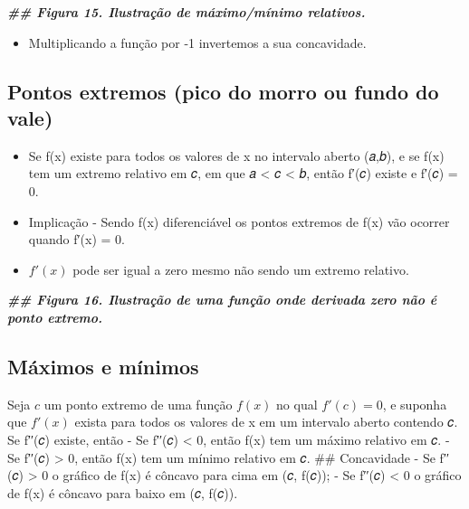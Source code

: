 \documentclass[
]{article}
\newenvironment{Shaded}{\begin{snugshade}}{\end{snugshade}}
\newcommand{\DocumentationTok}[1]{\textcolor[rgb]{0.56,0.35,0.01}{\textbf{\textit{#1}}}}
\providecommand{\tightlist}{%
  \setlength{\itemsep}{0pt}\setlength{\parskip}{0pt}}
\begin{document}
\begin{Shaded}
\begin{Highlighting}[]
\DocumentationTok{\#\# Figura 15. Ilustração de máximo/mínimo relativos.}
\end{Highlighting}
\end{Shaded}

\begin{itemize}
\tightlist
\item
  Multiplicando a função por -1 invertemos a sua concavidade.
\end{itemize}

\hypertarget{pontos-extremos-pico-do-morro-ou-fundo-do-vale}{%
\subsection{Pontos extremos (pico do morro ou fundo do
vale)}\label{pontos-extremos-pico-do-morro-ou-fundo-do-vale}}

\begin{itemize}
\tightlist
\item
  Se f(x) existe para todos os valores de x no intervalo aberto (𝑎,𝑏), e
  se f(x) tem um extremo relativo em 𝑐, em que 𝑎 \textless{} 𝑐
  \textless{} 𝑏, então f′(𝑐) existe e f′(𝑐) = 0.
\item
  Implicação - Sendo f(x) diferenciável os pontos extremos de f(x) vão
  ocorrer quando f′(x) = 0.
\item
  \(f'(x)\) pode ser igual a zero mesmo não sendo um extremo relativo.
\end{itemize}

\begin{Shaded}
\begin{Highlighting}[]
\DocumentationTok{\#\# Figura 16. Ilustração de uma função onde derivada zero não é ponto extremo.}
\end{Highlighting}
\end{Shaded}

\hypertarget{muxe1ximos-e-muxednimos-1}{%
\subsection{Máximos e mínimos}\label{muxe1ximos-e-muxednimos-1}}

Seja \(c\) um ponto extremo de uma função \(f(x)\) no qual
\(f'(c) = 0\), e suponha que \(f'(x)\) exista para todos os valores de x
em um intervalo aberto contendo 𝑐. Se f′′(𝑐) existe, então - Se f′′(𝑐)
\textless{} 0, então f(x) tem um máximo relativo em 𝑐. - Se f′′(𝑐)
\textgreater{} 0, então f(x) tem um mínimo relativo em 𝑐. \#\#
Concavidade - Se f′′(𝑐) \textgreater{} 0 o gráfico de f(x) é côncavo
para cima em (𝑐, f(𝑐)); - Se f′′(𝑐) \textless{} 0 o gráfico de f(x) é
côncavo para baixo em (𝑐, f(𝑐)).
\end{document}
